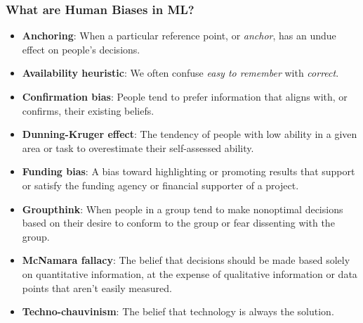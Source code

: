 \documentclass[11pt,aspectratio=169,hyperref={colorlinks}]{beamer}
\begin{document}
		\begin{frame}				
			
			\frametitle{What are Human Biases in ML?}		
		
			\begin{itemize}\small
				\item \textbf{Anchoring}: When a particular reference point, or \textit{anchor}, has an undue effect on people’s decisions. 
				\item \textbf{Availability heuristic}: We often confuse \textit{easy to remember} with \textit{correct}.
				\item \textbf{Confirmation bias}: People tend to prefer information that aligns with, or confirms, their existing beliefs.
				\item \textbf{Dunning-Kruger effect}: The tendency of people with low ability in a given area or task to overestimate their self-assessed ability.
				\item \textbf{Funding bias}: A bias toward highlighting or promoting results that support or satisfy the funding agency or financial supporter of a project.
				\item \textbf{Groupthink}: When people in a group tend to make nonoptimal decisions based on their desire to conform to the group or fear dissenting with the group.
				\item \textbf{McNamara fallacy}: The belief that decisions should be made based solely on quantitative information, at the expense of qualitative information or data points that aren't easily measured.
				\item \textbf{Techno-chauvinism}: The belief that technology is always the solution.		
			\end{itemize}		
		
		\end{frame}
		
\end{document}
